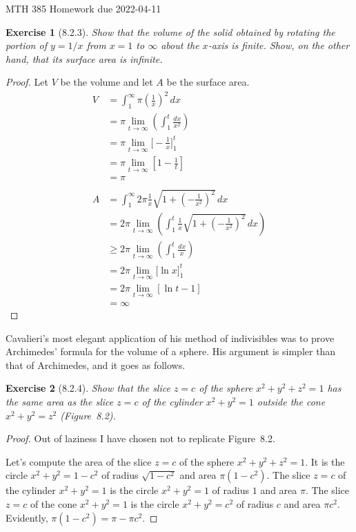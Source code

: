 \documentclass[12pt]{article}
\theoremstyle{plain}
\newtheorem{ex}{Exercise}
\begin{document}
MTH 385 \qquad Homework due 2022-04-11

\begin{ex} [8.2.3]
  Show that the volume of the solid obtained by rotating the portion of $y=1/x$ from $x=1$ to $\infty$ about the $x$-axis is finite. Show, on the other hand, that its surface area is infinite.
\end{ex}

\begin{proof}
  Let $V$ be the volume and let $A$ be the surface area.
  \begin{align*}
    V &= \int_1^\infty\pi\left(\frac{1}{x}\right)^2\,dx \\
      &= \pi\lim_{t\to\infty}\left(\int_1^t\frac{dx}{x^2}\right) \\
      &= \pi\lim_{t\to\infty}\Bigg[-\frac{1}{x}\Bigg]_1^t  \\
      &= \pi\lim_{t\to\infty}\left[1-\frac{1}{t}\right] \\
      &= \pi \\
      \\
    A &= \int_1^\infty2\pi\frac{1}{x}\sqrt{1+\left(-\frac{1}{x^2}\right)^2}\,dx \\
      &= 2\pi\lim_{t\to\infty}\left(\int_1^t\frac{1}{x}\sqrt{1+\left(-\frac{1}{x^2}\right)^2}\,dx\right) \\
      &\geq 2\pi\lim_{t\to\infty}\left(\int_1^t\frac{dx}{x}\right) \\
      &= 2\pi\lim_{t\to\infty}\Bigg[\ln x\Bigg]_1^t \\
      &= 2\pi\lim_{t\to\infty}[\ln t-1] \\
      &= \infty
  \end{align*}
\end{proof}

Cavalieri's most elegant application of his method of indivisibles was to prove Archimedes' formula for the volume of a sphere. His argument is simpler than that of Archimedes, and it goes as follows.

\begin{ex} [8.2.4]
  Show that the slice $z=c$ of the sphere $x^2+y^2+z^2=1$ has the same area as the slice $z=c$ of the cylinder $  x^2+y^2=1$ outside the cone $x^2+y^2=z^2$ (Figure~8.2).
\end{ex}

\begin{proof}
  Out of laziness I have chosen not to replicate Figure~8.2.
  
  Let's compute the area of the slice $z=c$ of the sphere $x^2+y^2+z^2=1$. It is the circle $x^2+y^2=1-c^2$ of radius $\sqrt{1-c^2}$ and area $\pi(1-c^2)$. The slice $z=c$ of the cylinder $x^2+y^2=1$ is the circle $x^2+y^2=1$ of radius $1$ and area $\pi$.  The slice $z=c$ of the cone $x^2+y^2=1$ is the circle $x^2+y^2=c^2$ of radius $c$ and area $\pi c^2$. Evidently, $\pi(1-c^2)=\pi-\pi c^2$. 
\end{proof}
\end{document}
